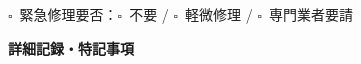 \documentclass[a4paper,12pt]{jarticle}
\newcommand{\checkbox}{$\square$\ }
\newcommand{\underlinespace}[1]{\underline{\hspace{#1}}}
\begin{document}
\vspace{2mm}

\noindent
\checkbox 緊急修理要否：\quad \checkbox 不要 \quad / \quad \checkbox 軽微修理 \quad / \quad \checkbox 専門業者要請

\vspace{8mm}

\begin{center}
\textbf{\large 詳細記録・特記事項}
\end{center}

\vspace{3mm}

\noindent
\underlinespace{13cm}

\vspace{3mm}

\noindent
\underlinespace{13cm}

\vspace{3mm}

\noindent
\underlinespace{13cm}

\vspace{3mm}

\noindent
\underlinespace{13cm}

\vspace{3mm}

\noindent
\underlinespace{13cm}
\end{document}
